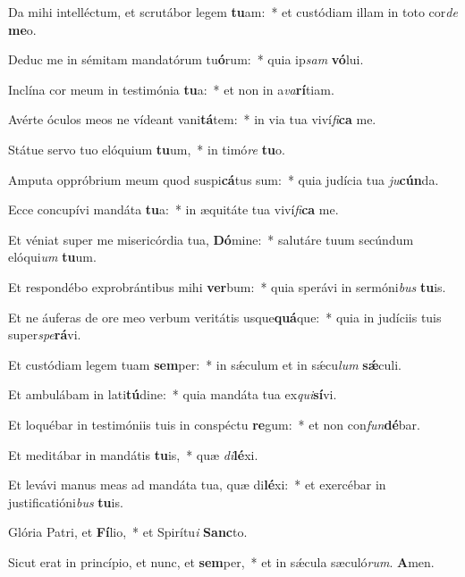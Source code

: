 \item Da mihi intelléctum, et scrutábor legem \textbf{tu}am:~* et custódiam illam in toto cor\emph{de} \textbf{me}o.
\item Deduc me in sémitam mandatórum tu\textbf{ó}rum:~* quia ip\emph{sam} \textbf{vó}lui.
\item Inclína cor meum in testimónia \textbf{tu}a:~* et non in a\emph{va}\textbf{rí}tiam.
\item Avérte óculos meos ne vídeant vani\textbf{tá}tem:~* in via tua viví\emph{fi}\textbf{ca} me.
\item Státue servo tuo elóquium \textbf{tu}um,~* in timó\emph{re} \textbf{tu}o.
\item Amputa oppróbrium meum quod suspi\textbf{cá}tus sum:~* quia judícia tua \emph{ju}\textbf{cún}da.
\item Ecce concupívi mandáta \textbf{tu}a:~* in æquitáte tua viví\emph{fi}\textbf{ca} me.
\item Et véniat super me misericórdia tua, \textbf{Dó}mine:~* salutáre tuum secúndum elóqui\emph{um} \textbf{tu}um.
\item Et respondébo exprobrántibus mihi \textbf{ver}bum:~* quia sperávi in sermóni\emph{bus} \textbf{tu}is.
\item Et ne áuferas de ore meo verbum veritátis usque\textbf{quá}que:~* quia in judíciis tuis super\emph{spe}\textbf{rá}vi.
\item Et custódiam legem tuam \textbf{sem}per:~* in sǽculum et in sǽcu\emph{lum} \textbf{sǽ}culi.
\item Et ambulábam in lati\textbf{tú}dine:~* quia mandáta tua ex\emph{qui}\textbf{sí}vi.
\item Et loquébar in testimóniis tuis in conspéctu \textbf{re}gum:~* et non con\emph{fun}\textbf{dé}bar.
\item Et meditábar in mandátis \textbf{tu}is,~* quæ \emph{di}\textbf{lé}xi.
\item Et levávi manus meas ad mandáta tua, quæ di\textbf{lé}xi:~* et exercébar in justificatióni\emph{bus} \textbf{tu}is.
\item Glória Patri, et \textbf{Fí}lio,~* et Spirítu\emph{i} \textbf{Sanc}to.
\item Sicut erat in princípio, et nunc, et \textbf{sem}per,~* et in sǽcula sæculó\emph{rum}. \textbf{A}men.

